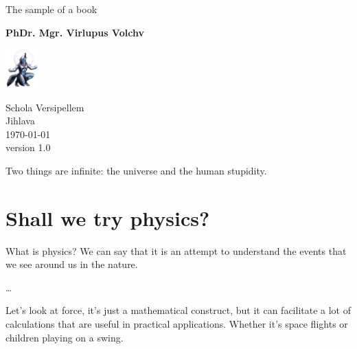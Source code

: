 \documentclass[a5paper,12pt]{book}							%
\begin{document}
	
	
	\begin{titlepage}
		\begin{center}
			\vspace*{10mm}
			
			{\Huge The sample of a book}\\
			\vspace{5mm}
			
			\vfill
			
			{\large \textbf{PhDr. Mgr. Virlupus Volchv}}\\
			\vfill
			
			\includegraphics[width=0.1\textwidth]{"logo.png"}
			
			{\small Schola Versipellem\\}
			{\footnotesize Jihlava\\}
			{\scriptsize \today}\\
			{\scriptsize version 1.0}
		\end{center}
	\end{titlepage}
	
	\tableofcontents
	
	
	\begin{savequote}[.75 \textwidth]
		Two things are infinite: the universe and the human stupidity.
	\end{savequote}
	
	\chapter{Shall we try physics?}
	
	What is physics? We can say that it is an attempt to understand the events that we see around us in the nature.
	
	\dots
	
	Let's look at force, it's just a mathematical construct, but it can facilitate a lot of calculations that are useful in practical applications. Whether it's space flights or children playing on a swing.
	
\end{document}
